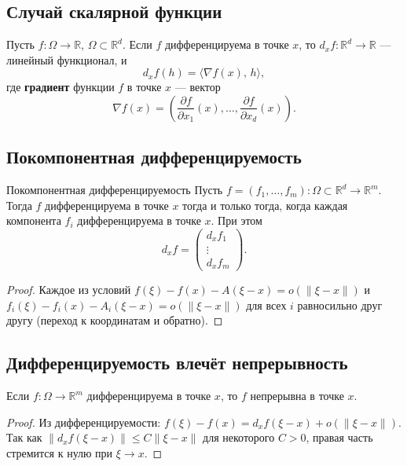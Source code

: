 \subsection{Случай скалярной функции}

Пусть $f\colon\Omega \to \mathbb{R}$, $\Omega \subset \mathbb{R}^d$.
Если $f$ дифференцируема в точке $x$, то $d_xf\colon\mathbb{R}^d\to\mathbb{R}$ ---
линейный функционал, и
\[
d_xf(h)=\langle \nabla f(x),\,h\rangle,
\]
где \textbf{градиент} функции $f$ в точке $x$ --- вектор
\[
\nabla f(x)=
\left(
\frac{\partial f}{\partial x_1}(x),
\dots,
\frac{\partial f}{\partial x_d}(x)
\right).
\]

\subsection{Покомпонентная дифференцируемость}

\begin{Theorem}{Покомпонентная дифференцируемость}{}
	Пусть $f=(f_1,\dots,f_m)\colon\Omega\subset\mathbb{R}^d\to\mathbb{R}^m$.
	Тогда $f$ дифференцируема в точке $x$ тогда и только тогда, когда каждая компонента
	$f_i$ дифференцируема в точке $x$.	При этом
	\[
	d_xf=
	\begin{pmatrix}
		d_xf_1 \\ \vdots \\ d_xf_m
	\end{pmatrix}.
	\]
\end{Theorem}

\begin{proof}
	Каждое из условий $f(\xi)-f(x)-A(\xi-x)=o(\|\xi-x\|)$ и
	$f_i(\xi)-f_i(x)-A_i(\xi-x)=o(\|\xi-x\|)$ для всех $i$ равносильно друг другу
	(переход к координатам и обратно).
\end{proof}

\subsection{Дифференцируемость влечёт непрерывность}

\begin{Theorem}{}{}
	Если $f\colon\Omega \to \mathbb{R}^m$ дифференцируема в точке $x$, то $f$ непрерывна
	в точке $x$.
\end{Theorem}

\begin{proof}
	Из дифференцируемости: $f(\xi)-f(x)=d_xf(\xi-x)+o(\|\xi-x\|)$.
	Так как $\|d_xf(\xi-x)\|\le C\|\xi-x\|$ для некоторого $C>0$, правая часть стремится
	к нулю при $\xi\to x$.
\end{proof}

